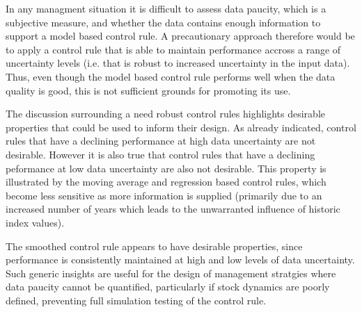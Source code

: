 \documentclass[11pt]{article} %
\begin{document}
In any managment situation it is difficult to assess data paucity, which is a subjective measure, and whether the data contains enough information to support a model based control rule. A precautionary approach therefore would be to apply a control rule that is able to maintain performance accross a range of uncertainty levels (i.e. that is robust to increased uncertainty in the input data). Thus, even though the model based control rule performs well when the data quality is good, this is not sufficient grounds for promoting its use. 

The discussion surrounding a need robust control rules highlights desirable properties that could be used to inform their design. As already indicated, control rules that have a declining performance at high data uncertainty are not desirable. However it is also true that control rules that have a declining peformance at low data uncertainty are also not desirable. This property is illustrated by the moving average and regression based control rules, which become less sensitive as more information is supplied (primarily due to an increased number of years which leads to the unwarranted influence of historic index values). 

The smoothed control rule appears to have desirable properties, since performance is consistently maintained at high and low levels of data uncertainty. Such generic insights are useful for the design of management stratgies where data paucity cannot be quantified, particularly if stock dynamics are poorly defined, preventing full simulation testing of the control rule.
\end{document}
